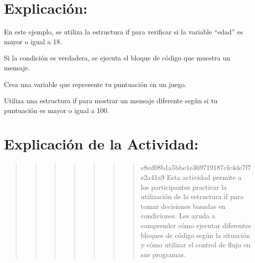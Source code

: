\documentclass[
  a4paper,
  DIV=11,
  numbers=noendperiod,
  onepage,
  openany]{scrreprt}
\begin{document}
\hypertarget{explicaciuxf3n-29}{%
\section{Explicación:}\label{explicaciuxf3n-29}}

En este ejemplo, se utiliza la estructura if para verificar si la
variable ``edad'' es mayor o igual a 18.

Si la condición es verdadera, se ejecuta el bloque de código que muestra
un mensaje.

\begin{tcolorbox}[enhanced jigsaw, colbacktitle=quarto-callout-important-color!10!white, toprule=.15mm, leftrule=.75mm, titlerule=0mm, opacityback=0, rightrule=.15mm, opacitybacktitle=0.6, breakable, left=2mm, coltitle=black, title=\textcolor{quarto-callout-important-color}{\faExclamation}\hspace{0.5em}{Actividad Práctica:}, toptitle=1mm, bottomtitle=1mm, arc=.35mm, bottomrule=.15mm, colback=white, colframe=quarto-callout-important-color-frame]

Crea una variable que represente tu puntuación en un juego.

Utiliza una estructura if para mostrar un mensaje diferente según si tu
puntuación es mayor o igual a 100.

\end{tcolorbox}

\hypertarget{explicaciuxf3n-de-la-actividad-27}{%
\section{Explicación de la
Actividad:}\label{explicaciuxf3n-de-la-actividad-27}}

\begin{quote}
\begin{quote}
\begin{quote}
\begin{quote}
\begin{quote}
\begin{quote}
\begin{quote}
e8ed08b1a5bbe1e369719187cfc4de7f7e2a41a9 Esta actividad permite a los
participantes practicar la utilización de la estructura if para tomar
decisiones basadas en condiciones. Les ayuda a comprender cómo ejecutar
diferentes bloques de código según la situación y cómo utilizar el
control de flujo en sus programas.
\end{quote}
\end{quote}
\end{quote}
\end{quote}
\end{quote}
\end{quote}
\end{quote}
\end{document}
